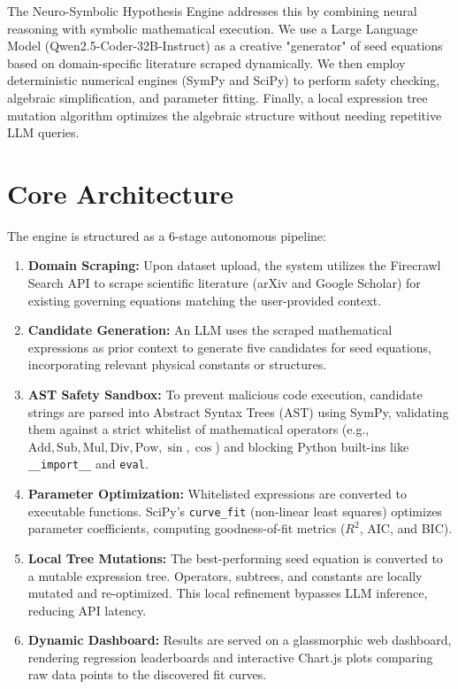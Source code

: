 \documentclass[journal]{IEEEtran}
\begin{document}
The Neuro-Symbolic Hypothesis Engine addresses this by combining neural reasoning with symbolic mathematical execution. We use a Large Language Model (Qwen2.5-Coder-32B-Instruct) as a creative "generator" of seed equations based on domain-specific literature scraped dynamically. We then employ deterministic numerical engines (SymPy and SciPy) to perform safety checking, algebraic simplification, and parameter fitting. Finally, a local expression tree mutation algorithm optimizes the algebraic structure without needing repetitive LLM queries.

\section{Core Architecture}
The engine is structured as a 6-stage autonomous pipeline:
\begin{enumerate}
    \item \textbf{Domain Scraping:} Upon dataset upload, the system utilizes the Firecrawl Search API to scrape scientific literature (arXiv and Google Scholar) for existing governing equations matching the user-provided context.
    \item \textbf{Candidate Generation:} An LLM uses the scraped mathematical expressions as prior context to generate five candidates for seed equations, incorporating relevant physical constants or structures.
    \item \textbf{AST Safety Sandbox:} To prevent malicious code execution, candidate strings are parsed into Abstract Syntax Trees (AST) using SymPy, validating them against a strict whitelist of mathematical operators (e.g., $\text{Add}, \text{Sub}, \text{Mul}, \text{Div}, \text{Pow}, \sin, \cos$) and blocking Python built-ins like \texttt{\_\_import\_\_} and \texttt{eval}.
    \item \textbf{Parameter Optimization:} Whitelisted expressions are converted to executable functions. SciPy's \texttt{curve\_fit} (non-linear least squares) optimizes parameter coefficients, computing goodness-of-fit metrics ($R^2$, AIC, and BIC).
    \item \textbf{Local Tree Mutations:} The best-performing seed equation is converted to a mutable expression tree. Operators, subtrees, and constants are locally mutated and re-optimized. This local refinement bypasses LLM inference, reducing API latency.
    \item \textbf{Dynamic Dashboard:} Results are served on a glassmorphic web dashboard, rendering regression leaderboards and interactive Chart.js plots comparing raw data points to the discovered fit curves.
\end{enumerate}
\end{document}
